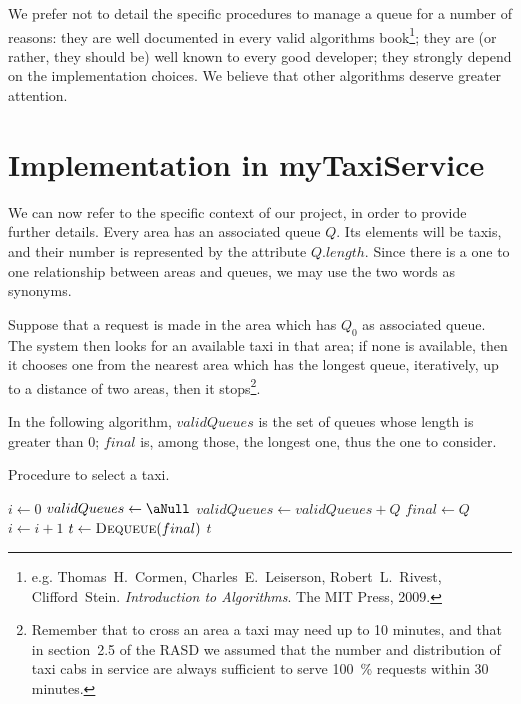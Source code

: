 We prefer not to detail the specific procedures to manage a queue for a number of reasons: they are well documented in every valid algorithms book\footnote{e.g. Thomas~H.~Cormen, Charles~E.~Leiserson, Robert~L.~Rivest, Clifford~Stein. \emph{Introduction to Algorithms}. The MIT Press, 2009.}; they are (or rather, they should be) well known to every good developer; they strongly depend on the implementation choices. We believe that other algorithms deserve greater attention.


\section{Implementation in myTaxiService}
We can now refer to the specific context of our project, in order to provide further details. Every area has an associated queue $Q$. Its elements will be taxis, and their number is represented by the attribute $Q.length$. Since there is a one to one relationship between areas and queues, we may use the two words as synonyms.

Suppose that a request is made in the area which has $Q_0$ as associated queue. The system then looks for an available taxi in that area; if none is available, then it chooses one from the nearest area which has the longest queue, iteratively, up to a distance of two areas, then it stops\footnote[][-2em]{Remember that to cross an area a taxi may need up to \num{10} minutes, and that in section~2.5 of the RASD we assumed that the number and distribution of taxi cabs in service are always sufficient to serve \SI{100}{\percent} requests within \num{30} minutes.}. 

In the following algorithm, $validQueues$ is the set of queues whose length is greater than $0$; $final$ is, among those, the longest one, thus the one to consider.

\newcommand{\GetTaxi}{GetTaxi} %

\begin{algorithm}
\caption{Procedure to select a taxi.}\label{alg:selectTaxi}
\begin{algorithmic}[1]
\Procedure{\GetTaxi}{$Q_0$}
	\State $i \gets 0$  
	\Repeat \label{gt:repeat}
		\State $validQueues \gets \aNull$ \label{gt:init2}
		\label{gt:forValid}
				\State $validQueues \gets validQueues + Q$
			\EndIf
		\EndFor\label{gt:endForValid}
		\label{gt:forFinal}
				\State $final \gets Q$
			\EndIf
		\EndFor\label{gt:endForFinal}
		\State $i \gets i + 1$
	 \label{gt:until}
	\State $t \gets \Call{Dequeue}{final}$ 
	\State \Return $t$ 
\EndProcedure
\end{algorithmic}
\end{algorithm}

